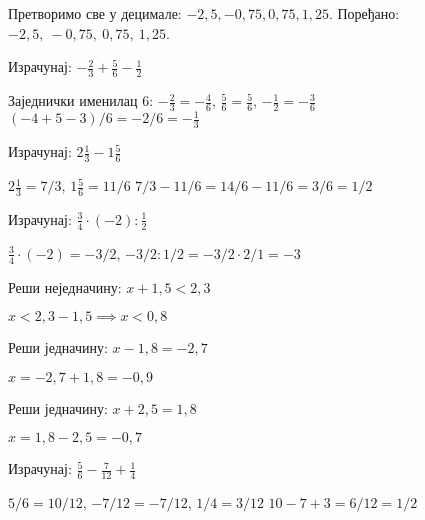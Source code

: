\documentclass[11pt,a5paper,addpoints]{exam}
\begin{document}
\begin{questions}
\begin{center}
\end{center}

\begin{solution}[\stretch 2]
Претворимо све у децимале: $-2,5,-0,75,0,75,1,25$.  
Поређано: $-2,5,\ -0,75,\ 0,75,\ 1,25$.
\end{solution}

\question[3]
Израчунај: $-\frac{2}{3} + \frac{5}{6} - \frac{1}{2}$

\begin{solution}[\stretch 2]
Заједнички именилац 6:  
$-\frac{2}{3}=-\frac{4}{6}$, $\frac{5}{6}=\frac{5}{6}$, $-\frac{1}{2}=-\frac{3}{6}$  
$(-4+5-3)/6 = -2/6=-\frac{1}{3}$
\end{solution}

\ifprintanswers\else\newpage\fi

\question[3]
Израчунај: $2\frac{1}{3}-1\frac{5}{6}$

\begin{solution}[\stretch 2]
$2\frac{1}{3}=7/3$, $1\frac{5}{6}=11/6$  
$7/3-11/6=14/6-11/6=3/6=1/2$
\end{solution}

\question[3]
Израчунај: $\frac{3}{4}\cdot(-2):\frac{1}{2}$

\begin{solution}[\stretch 2]
$\frac{3}{4}\cdot(-2)=-3/2$,  
$-3/2 : 1/2 = -3/2 \cdot 2/1 = -3$
\end{solution}

\question[3]
Реши неједначину: $x+1,5<2,3$

\begin{solution}[\stretch 2]
$x<2,3-1,5 \implies x<0,8$
\end{solution}

\ifprintanswers\else\newpage\fi

\question[3]
Реши једначину: $x-1,8=-2,7$

\begin{solution}[\stretch 2]
$x=-2,7+1,8=-0,9$
\end{solution}

\question[3]
Реши једначину: $x+2,5=1,8$

\begin{solution}[\stretch 2]
$x=1,8-2,5=-0,7$
\end{solution}

\question[3]
Израчунај: $\frac{5}{6}-\frac{7}{12}+\frac{1}{4}$

\begin{solution}[\stretch 2]
$5/6=10/12$, $-7/12=-7/12$, $1/4=3/12$  
$10-7+3=6/12=1/2$
\end{solution}

\end{questions}
\end{document}
